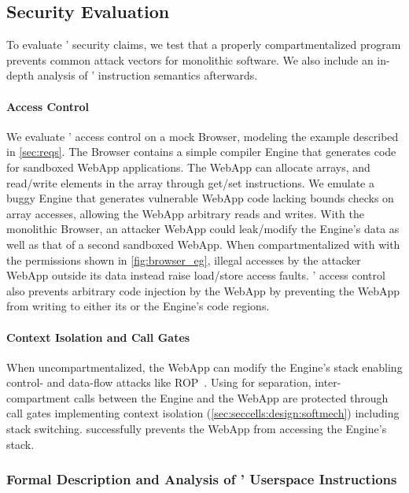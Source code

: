 \subsection{Security Evaluation}

To evaluate \seccells' security claims, we test that a properly 
compartmentalized \seccells program prevents common attack vectors
for monolithic software.
We also include an in-depth analysis of \seccells' instruction semantics
afterwards.

\paragraph{Access Control}
We evaluate \seccells' access control on a mock Browser,
modeling the example described in \autoref{sec:reqs}.
The Browser contains a simple compiler Engine that generates code for
sandboxed WebApp applications.
The WebApp can allocate arrays, and read/write elements in the array through
get/set instructions.
We emulate a buggy Engine that generates vulnerable WebApp code lacking bounds 
checks on array accesses, allowing the WebApp arbitrary reads and writes.
With the monolithic Browser, an attacker WebApp could leak/modify the
Engine's data as well as that of a second sandboxed WebApp.
When compartmentalized with \seccells with the permissions shown in 
\autoref{fig:browser_eg}, illegal accesses by the attacker WebApp outside its
data \cell instead raise load/store access faults.
\seccells' access control also prevents arbitrary code injection by the WebApp
by preventing the WebApp from writing to either its or the Engine's code regions.

\paragraph{Context Isolation and Call Gates}
When uncompartmentalized, the WebApp can modify the Engine's stack enabling
control- and data-flow attacks like ROP~\cite{Shacham07}.
Using \seccells for separation, inter-compartment calls between the 
Engine and the WebApp are protected through call gates 
implementing context isolation (\autoref{sec:seccells:design:softmech}) including
stack switching.
\seccells successfully prevents the WebApp from accessing the Engine's stack.

\subsubsection{Formal Description and Analysis of \seccells' 
Userspace Instructions}

